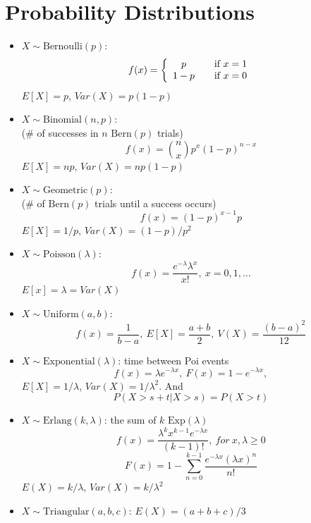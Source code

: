 \documentclass[10pt, twocolumn]{article}
\begin{document}
\section*{Probability Distributions} \vspace*{-1em}
\begin{itemize}
\item $X\sim \text{Bernoulli}(p)$:
\[ f(x) = \left\{ 
  \begin{array}{c l}
    p & \quad \text{if $x=1$}\\
    1-p & \quad \text{if $x=0$}
  \end{array} \right.\]
$E[X]=p$, $Var(X)=p(1-p)$
\item $X\sim \text{Binomial}(n,p)$: \\
(\# of successes in $n$ $\text{Bern}(p)$ trials)
\[ f(x)={n \choose x}p^x(1-p)^{n-x} \]
$E[X]=np$, $Var(X)=np(1-p)$
\item $X\sim \text{Geometric}(p)$: \\
(\# of $\text{Bern}(p)$ trials until a success occurs)
\[ f(x) = (1-p)^{x-1}p \]
$E[X]=1/p$, $Var(X)=(1-p)/p^2$
\item $X\sim \text{Poisson}(\lambda)$: 
\[ f(x) = \frac{e^{-\lambda}\lambda ^x}{x!},\ x=0,1,\dots \]
$E[x]=\lambda=Var(X)$
\item $X\sim \text{Uniform}(a,b)$: 
\[ f(x)=\frac{1}{b-a},\ E[X]=\frac{a+b}{2},\ V(X)=\frac{(b-a)^2}{12} \]
\item $X\sim \text{Exponential}(\lambda)$: time between Poi events
\[ f(x)=\lambda e^{-\lambda x},\ F(x)=1-e^{-\lambda x}, \]
$E[X]=1/\lambda$, $Var(X)=1/\lambda^2$. And 
\[ P(X>s+t|X>s)=P(X>t) \]
\item $X\sim \text{Erlang}(k, \lambda)$: the sum of $k$ $\text{Exp}(\lambda)$
\[ f(x)=\frac{\lambda^kx^{k-1}e^{-\lambda x}}{(k-1)!},\ for\ x,\lambda\geq0 \]
\[ F(x)=1-\sum_{n=0}^{k-1}\frac{e^{-\lambda x}(\lambda x)^n}{n!} \]
$E(X)=k/\lambda$, $Var(X)=k/\lambda^2$
\item $X\sim \text{Triangular}(a,b,c)$: $E(X)=(a+b+c)/3$

\end{itemize}
\end{document}
